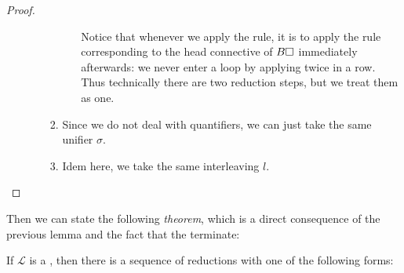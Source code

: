 \begin{scope}
\begin{proof}
\begin{enumerate}[itemsep=0.8em]
\begin{itemize}
\begin{enumerate}[itemsep=0.4em]
\begin{itemize}
          Notice that whenever we apply the {} rule, it is to apply
          the rule corresponding to the head connective of $B\square$ immediately
          afterwards: we never enter a loop by applying {} twice in
          a row. Thus technically there are two reduction steps, but we treat
          them as one.
        \end{itemize}

        \item Since we do not deal with quantifiers, we can just take the same
        unifier $\sigma$.

        \item Idem here, we take the same interleaving $l$.
      \end{enumerate}
    \end{itemize} 
  \end{enumerate}
\end{proof}

Then we can state the following \emph{ theorem}, which is a direct
consequence of the previous lemma and the fact that the 
terminate:

\begin{theorem}[Productivity]
If $$ is a  , then there
is a sequence of reductions with one of the following forms:
\end{theorem}


\end{scope}
